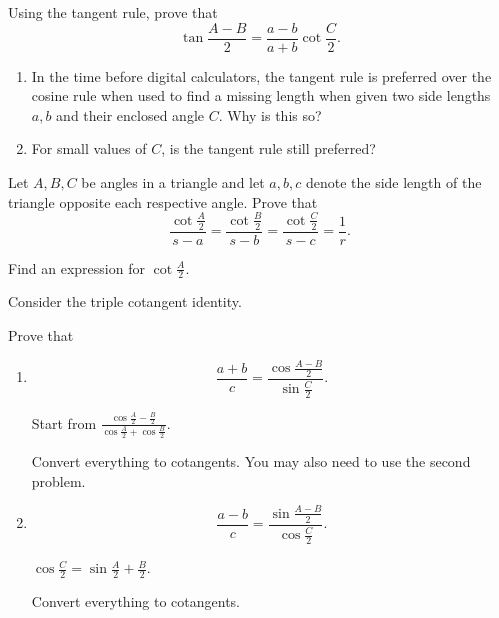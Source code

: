 \documentclass[../jarvis.tex]{subfiles}
\begin{document}
Using the tangent rule, prove that $$\tan{\frac{A-B}{2}}=\frac{a-b}{a+b}\cot{\frac{C}{2}}.$$

\begin{enumerate}
    \item In the time before digital calculators, the tangent rule is preferred over the cosine rule when used to find a missing length when given two side lengths $a,b$ and their enclosed angle $C$. Why is this so?
    \item For small values of $C$, is the tangent rule still preferred?
\end{enumerate}

 Let $A,B,C$ be angles in a triangle and let $a,b,c$ denote the side length of the triangle opposite each respective angle. Prove that 
$$\frac{\cot{\frac{A}{2}}}{s-a}=\frac{\cot{\frac{B}{2}}}{s-b}=\frac{\cot{\frac{C}{2}}}{s-c}=\frac{1}{r}.$$
\begin{hints}
    \begin{hint}
        Find an expression for $\cot{\frac{A}{2}}.$
    \end{hint}
    \begin{hint}
        Consider the triple cotangent identity.
    \end{hint}
\end{hints}

 Prove that
\begin{enumerate}
    \item $$\frac{a+b}{c}=\frac{\cos{\frac{A-B}{2}}}{\sin{\frac{C}{2}}}.$$
    \begin{hints}
        \begin{hint}
            Start from $\frac{\cos{\frac{A}{2}-\frac{B}{2}}}{\cos{\frac{A}{2}}+\cos{\frac{B}{2}}}.$
        \end{hint}
        \begin{hint}
            Convert everything to cotangents. You may also need to use the second problem. 
        \end{hint}
    \end{hints}
    \item $$\frac{a-b}{c}=\frac{\sin{\frac{A-B}{2}}}{\cos{\frac{C}{2}}}.$$
    \begin{hints}
        \begin{hint}
            $\cos{\frac{C}{2}}=\sin{\frac{A}{2}+\frac{B}{2}}$.
        \end{hint}
        \begin{hint}
            Convert everything to cotangents.
        \end{hint}
    \end{hints}
\end{enumerate}
\end{document}
